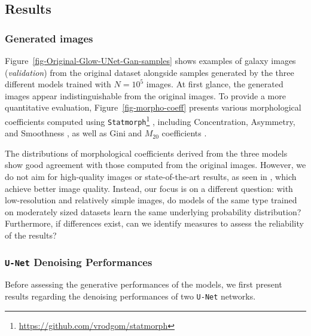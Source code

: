 \documentclass[fleqn,usenatbib]{mnras}
\begin{document}
\subsection{Results}
\label{sec-Results}
%
\subsubsection{Generated images}
\label{sec-Generated-Images}
%
Figure~\ref{fig-Original-Glow-UNet-Gan-samples} shows examples of galaxy images (\textit{validation}) from the original dataset alongside samples generated by the three different models trained with $N = 10^5$ images.
%
%
At first glance, the generated images appear indistinguishable from the original images. To provide a more quantitative evaluation, Figure~\ref{fig-morpho-coeff} presents various morphological coefficients computed using \texttt{Statmorph}\footnote{\url{https://github.com/vrodgom/statmorph}} \citep{2019MNRAS.483.4140R}, including Concentration, Asymmetry, and Smoothness \citep{2000AJ....119.2645B,2003ApJS..147....1C,2004AJ....128..163L}, as well as Gini and $M_{20}$ coefficients \citep{2004AJ....128..163L,10.1093/mnras/stv2078}.



The distributions of morphological coefficients derived from the three models show good agreement with those computed from the original images. However, we do not aim for high-quality images or state-of-the-art results, as seen in \citep{ravanbakhsh2016, Fussell2019, Lanusse2021, smith2021, HACKSTEIN2023100685}, which achieve better image quality. Instead, our focus is on a different question: with low-resolution and relatively simple images, do models of the same type trained on moderately sized datasets learn the same underlying probability distribution? Furthermore, if differences exist, can we identify measures to assess the reliability of the results?
%
\subsubsection{\texttt{U-Net} Denoising Performances}
\label{sec-UNet-Perf}
%
Before assessing the generative performances of the models, we first present results regarding the denoising performances of two \texttt{U-Net} networks.
\end{document}
